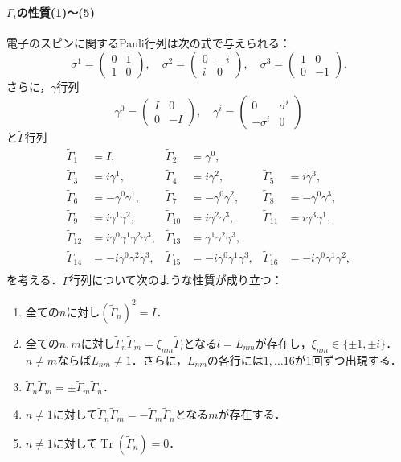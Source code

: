 \paragraph{$\Gamma_i$の性質(1)〜(5)}
電子のスピンに関するPauli行列は次の式で与えられる：
\[\sigma^1 =
\begin{pmatrix}
  0 & 1 \\
  1 & 0
\end{pmatrix}
,\quad\sigma^2 =
\begin{pmatrix}
  0 &  - i \\
  i & 0
\end{pmatrix}
,\quad\sigma^3 =
\begin{pmatrix}
  1 & 0 \\
  0 &  - 1
\end{pmatrix}
.\]
さらに，$\gamma$行列
\[\gamma^0=
\begin{pmatrix}
  I & 0 \\
  0 &  - I
\end{pmatrix}
,\quad\gamma^i =
\begin{pmatrix}
  0 & \sigma^i \\
   - \sigma^i & 0
\end{pmatrix}
\]
と$\tilde{\Gamma}$行列
\begin{align*}
  \tilde{\Gamma}_1 &= I, & \tilde{\Gamma}_2 &= \gamma^0, \\
  \tilde{\Gamma}_3 &= i\gamma^1, & \tilde{\Gamma}_4 &= i\gamma^2, & \tilde{\Gamma}_5 &= i\gamma^3, \\
  \tilde{\Gamma}_6 &=  - \gamma^0\gamma^1, & \tilde{\Gamma}_7 &=  - \gamma^0\gamma^2, & \tilde{\Gamma}_8 &=  - \gamma^0\gamma^3, \\
  \tilde{\Gamma}_9 &= i\gamma^1\gamma^2, & \tilde{\Gamma}_{10} &= i\gamma^2\gamma^3, & \tilde{\Gamma}_{11} &= i\gamma^3\gamma^1, \\
  \tilde{\Gamma}_{12} &= i\gamma^0\gamma^1\gamma^2\gamma^3, & \tilde{\Gamma}_{13} &= \gamma^1\gamma^2\gamma^3, \\
  \tilde{\Gamma}_{14} &=  - i\gamma^0\gamma^2\gamma^3, & \tilde{\Gamma}_{15} &=  - i\gamma^0\gamma^1\gamma^3, & \tilde{\Gamma}_{16} &=  - i\gamma^0\gamma^1\gamma^2, \\
\end{align*}
を考える．$\tilde{\Gamma}$行列について次のような性質が成り立つ：
\begin{enumerate}
  \item 全ての$n$に対し$(\tilde{\Gamma}_n)^2 = I$．
  \item 全ての$n,m$に対し$\tilde{\Gamma}_n\tilde{\Gamma}_m=\xi_{nm}\tilde{\Gamma}_l$となる$l=L_{nm}$が存在し，$\xi_{nm}\in\{\pm1,\pm i\}$．$n\neq m$ならば$L_{nm}\neq 1$．さらに，$L_{nm}$の各行には$1,\ldots 16$が1回ずつ出現する．
  \item $\tilde{\Gamma}_n\tilde{\Gamma}_m=\pm\tilde{\Gamma}_m\tilde{\Gamma}_n$．
  \item $n\neq 1$に対して$\tilde{\Gamma}_n\tilde{\Gamma}_m= - \tilde{\Gamma}_m\tilde{\Gamma}_n$となる$m$が存在する．
  \item $n\neq 1$に対して$\operatorname{Tr}(\tilde{\Gamma}_n)=0$．
\end{enumerate}


